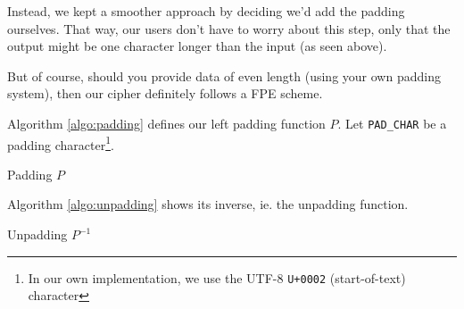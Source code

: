 \documentclass[twoside,twocolumn]{article}
\newcommand{\mod}[1]{\ \mathrm{mod}\ #1}
\theoremstyle{definition}
\theoremstyle{remark}
\begin{document}
Instead, we kept a smoother approach by deciding we'd add the padding ourselves. That way, our users don't have to worry about this step, only that the 
output might be one character longer than the input (as seen above).

But of course, should you provide data of even length (using your own padding system), then our cipher definitely follows a FPE scheme.

Algorithm \ref{algo:padding} defines our left padding function $P$.
Let \texttt{PAD\_CHAR} be a padding character\footnote{In our own implementation, we use the UTF-8 \texttt{U+0002} (start-of-text) character}.
\begin{algorithm}
    \eIf{$|m| \mod 2 = 0$}{
        \Return{$m$}
    }{
        \Return{\emph{\texttt{PAD\_CHAR}} $\mathbin\Vert m$}
    }
    \caption{Padding $P$}
    \label{algo:padding}
\end{algorithm}

Algorithm \ref{algo:unpadding} shows its inverse, ie. the unpadding function.

\begin{algorithm}
    \caption{Unpadding $P^{-1}$}
    \label{algo:unpadding}
\end{algorithm}
\end{document}
